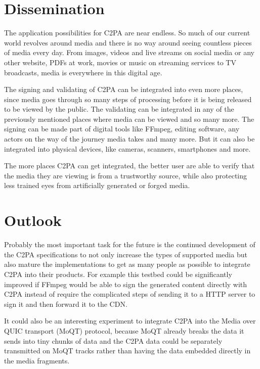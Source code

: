\section{Dissemination\label{sec:dissemination}}

The application possibilities for C2PA are near endless. So much of our current world revolves around media and there is no way around seeing countless pieces of media every day. From images, videos and live streams on social media or any other website, PDFs at work, movies or music on streaming services to TV broadcasts, media is everywhere in this digital age.

The signing and validating of C2PA can be integrated into even more places, since media goes through so many steps of processing before it is being released to be viewed by the public. The validating can be integrated in any of the previously mentioned places where media can be viewed and so many more. The signing can be made part of digital tools like FFmpeg, editing software, any actors on the way of the journey media takes and many more. But it can also be integrated into physical devices, like cameras, scanners, smartphones and more.

The more places C2PA can get integrated, the better user are able to verify that the media they are viewing is from a trustworthy source, while also protecting less trained eyes from artificially generated or forged media.

\section{Outlook\label{sec:outlook}}

Probably the most important task for the future is the continued development of the C2PA specifications to not only increase the types of supported media but also mature the implementations to get as many people as possible to integrate C2PA into their products. For example this testbed could be significantly improved if FFmpeg would be able to sign the generated content directly with C2PA instead of require the complicated steps of sending it to a HTTP server to sign it and then forward it to the CDN.

It could also be an interesting experiment to integrate C2PA into the Media over QUIC transport (MoQT) protocol, because MoQT already breaks the data it sends into tiny chunks of data and the C2PA data could be separately transmitted on MoQT tracks rather than having the data embedded directly in the media fragments.

